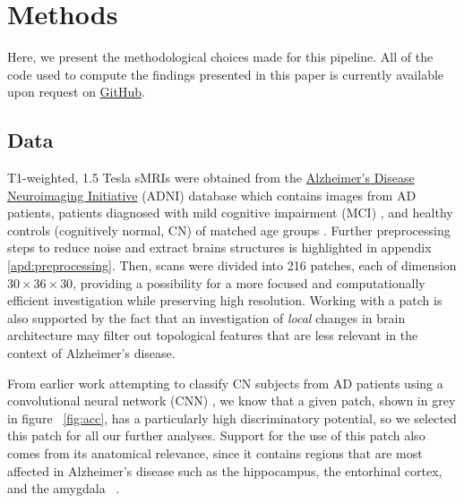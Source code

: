 \documentclass{article}
\begin{document}
\section{Methods}\label{sec:methods}

Here, we present the methodological choices made for this pipeline. All of the code used to compute
the findings presented in this paper is currently available upon request on
\href{https://github.com/pjhartout/TDA_ADNI_MLCB}{GitHub}.

\subsection{Data}

T1-weighted, 1.5 Tesla sMRIs were obtained from the \href{adni.loni.usc.edu}{Alzheimer's Disease
  Neuroimaging Initiative} (ADNI) database which contains images from AD patients, patients
diagnosed with mild cognitive impairment (MCI) \citep{gauthier2006mild}, and healthy controls
(cognitively normal, CN) of matched age groups \citep{jack2008alzheimer}. Further preprocessing
steps to reduce noise and extract brains structures is highlighted in appendix
\ref{apd:preprocessing}. Then, scans were divided into 216 patches, each of dimension
$30\times36\times30$, providing a possibility for a more focused and computationally efficient
investigation while preserving high resolution. Working with a patch is also supported by the fact
that an investigation of \emph{local} changes in brain architecture may filter out topological
features that are less relevant in the context of Alzheimer's disease.

From earlier work attempting to classify CN subjects from AD patients using a convolutional neural
network (CNN) \citep{bruningk2020image}, we know that a given patch, shown in grey in figure
~\ref{fig:acc}, has a particularly high discriminatory potential, so we selected this patch for all
our further analyses. Support for the use of this patch also comes from its anatomical relevance,
since it contains regions that are most affected in Alzheimer's disease such as the
hippocampus, the entorhinal cortex, and the amygdala ~\citep{goedert2006century}.
\end{document}
